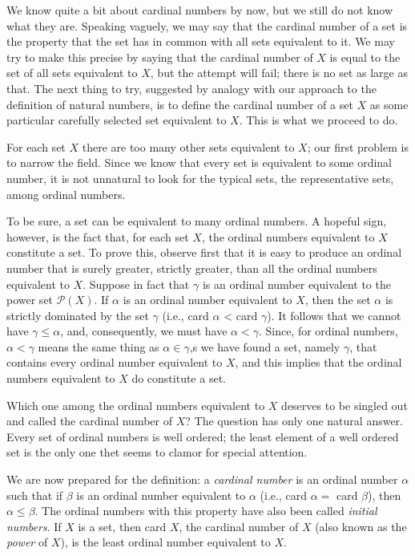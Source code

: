 

We know quite a bit about cardinal numbers by now, but we still do not know what they are. Speaking vaguely, we may say that the cardinal number of a set is the property that the set has in common with all sets equivalent to it. We may try to make this precise by saying that the cardinal number of $X$ is equal to the set of all sets equivalent to $X$, but the attempt will fail; there is no set as large as that. The next thing to try, suggested by analogy with our approach to the definition of natural numbers, is to define the cardinal number of a set $X$ as some particular carefully selected set equivalent to $X$. This is what we proceed to do. 

For each set $X$ there are too many other sets equivalent to $X$; our first problem is to narrow the field. Since we know that every set is equivalent to some ordinal number, it is not unnatural to look for the typical sets, the representative sets, among ordinal numbers. 

To be sure, a set can be equivalent to many ordinal numbers. A hopeful sign, however, is the fact that, for each set $X$, the ordinal numbers equivalent to $X$ constitute a set. To prove this, observe first that it is easy to produce an ordinal number that is surely greater, strictly greater, than all the ordinal numbers equivalent to $X$. Suppose in fact that $\gamma$ is an ordinal number equivalent to the power set $\mathcal{P}(X)$. If $\alpha$ is an ordinal number equivalent to $X$, then the set $\alpha$ is strictly dominated by the set $\gamma$ (i.e., card $\alpha$ < card $\gamma$). It follows that we cannot have $\gamma \le \alpha$, and, consequently, we must have $\alpha < \gamma$.  Since, for ordinal numbers, $\alpha < \gamma$ means the same thing as $\alpha \in \gamma$,s we have found a set, namely $\gamma$, that contains every ordinal number equivalent to $X$, and this implies that the ordinal numbers equivalent to $X$ do constitute a set. 

Which one among the ordinal numbers equivalent to $X$ deserves to be singled out and called the cardinal number of $X$? The question has only one natural answer. Every set of ordinal numbers is well ordered; the least element of a well ordered set is the only one thet seems to clamor for special attention. 

We are now prepared for the definition: a \textit{cardinal number} is an ordinal number $\alpha$ such that if $\beta$ is an ordinal number equivalent to $\alpha$ (i.e., card $\alpha =$ card $\beta$), then $\alpha \le \beta$. The ordinal numbers with this property have also been called \textit{initial numbers}. If $X$ is a set, then card $X$, the cardinal number of $X$ (also known as the \textit{power} of $X$), is the least ordinal number equivalent to $X$. 

